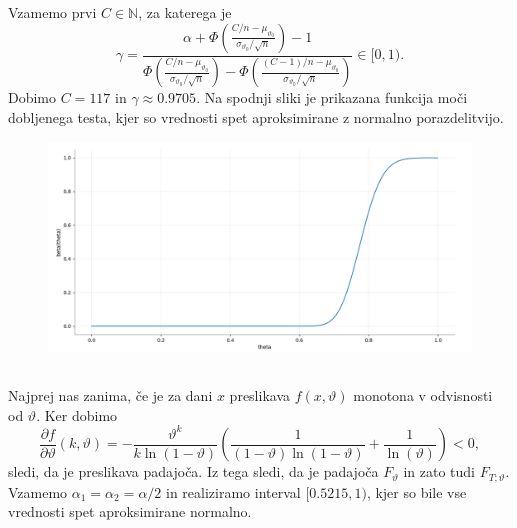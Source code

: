 \documentclass[ letterpaper, titlepage, fleqn]{article}
\newcommand{\N}{\mathbb N}
\begin{document}
Vzamemo prvi $C\in\N$, za katerega je 
$$\gamma = \frac{\alpha +
\Phi\left(\frac{C/n - \mu_{\vartheta_0}}{\sigma_{\vartheta_0} / \sqrt{n}}\right) - 1}
{\Phi\left(\frac{C/n - \mu_{\vartheta_0}}{\sigma_{\vartheta_0} / \sqrt{n}}\right) -
\Phi\left(\frac{(C-1)/n - \mu_{\vartheta_0}}{\sigma_{\vartheta_0} / \sqrt{n}}\right)} \in [0,1).$$
Dobimo $C = 117$ in $\gamma \approx 0.9705$. Na spodnji sliki je prikazana funkcija moči dobljenega testa,
kjer so vrednosti spet aproksimirane z normalno porazdelitvijo.
\begin{center}
\begin{figure}[h]
\begin{center}
\includegraphics[width=13cm]{graphics/FunkcijaMoci.png}
\end{center}
\end{figure}
\end{center}

\subsection{}
Najprej nas zanima, če je za dani $x$ preslikava $f(x, \vartheta)$ monotona v odvisnosti od $\vartheta$. Ker dobimo
$$\frac{\partial f}{\partial\vartheta} (k, \vartheta) = -\frac{\vartheta^k}{k\ln(1-\vartheta)} \left(\frac{1}{(1-\vartheta)\ln(1-\vartheta)} + \frac{1}{\ln(\vartheta)}\right) < 0,$$
sledi, da je preslikava padajoča. Iz tega sledi, da je padajoča $F_\vartheta$ in zato tudi $F_{T; \vartheta}$. Vzamemo $\alpha_1 = \alpha_2 = \alpha/2$ in realiziramo interval $[0.5215, 1)$, kjer so bile vse vrednosti spet aproksimirane normalno.

\section{}
\end{document}
